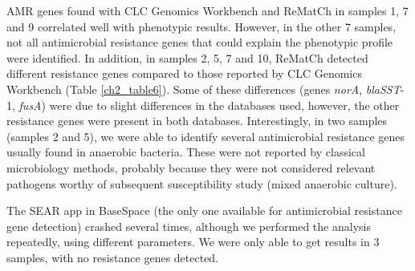 AMR genes found with CLC Genomics Workbench and ReMatCh in samples 1, 7 and 9 correlated well with phenotypic results. 
However, in the other 7 samples, not all antimicrobial resistance genes that could explain the phenotypic profile were identified. 
In addition, in samples 2, 5, 7 and 10, ReMatCh detected different resistance genes compared to those reported by CLC Genomics Workbench (Table \ref{ch2_table6}).
Some of these differences (genes \textit{norA}, \textit{blaSST}-1, \textit{fusA}) were due to slight differences in the databases used, however, the other resistance genes were present in both databases. 
Interestingly, in two samples (samples 2 and 5), we were able to identify several antimicrobial resistance genes usually found in anaerobic bacteria. 
These were not reported by classical microbiology methods, probably because they were not considered relevant pathogens worthy of subsequent susceptibility study (mixed anaerobic culture).

The SEAR app in BaseSpace (the only one available for antimicrobial resistance gene detection) crashed several times, although we performed the analysis repeatedly, using different parameters.
We were only able to get results in 3 samples, with no resistance genes detected.


